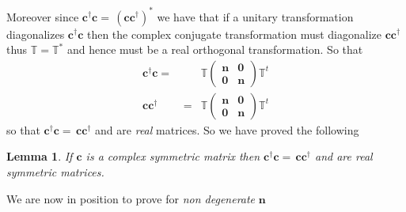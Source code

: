 \documentclass{article}
\newtheorem{lemma}[theorem]{Lemma}
\begin{document}
Moreover since $\mathbf{c}^{\dagger }\mathbf{c=\,}\left( \mathbf{cc}%
^{\dagger }\right) ^{\ast }$ we have that if a unitary transformation
diagonalizes $\mathbf{c}^{\dagger }\mathbf{c}$ then the complex conjugate
transformation must diagonalize $\mathbf{cc}^{\dagger }$ thus $\mathbb{T=T}%
^{\ast }$ and hence must be a real orthogonal transformation. So that 
\begin{eqnarray}
\mathbf{c}^{\dagger }\mathbf{c}\mathbf{=\,} &&\mathbb{T}\left( 
\begin{array}{cc}
\mathbf{n} & \mathbf{0} \\ 
\mathbf{0} & \mathbf{n}%
\end{array}%
\right) \mathbb{T}^{t} \\
\mathbf{cc}^{\dagger } &=&\mathbb{T}\left( 
\begin{array}{cc}
\mathbf{n} & \mathbf{0} \\ 
\mathbf{0} & \mathbf{n}%
\end{array}%
\right) \mathbb{T}^{t}
\end{eqnarray}%
so that $\mathbf{c}^{\dagger }\mathbf{c=\,cc}^{\dagger }$ and are \emph{real 
}matrices. So we have proved the following

\begin{lemma}
If $\mathbf{c}$ is a complex symmetric matrix then $\mathbf{c}^{\dagger }%
\mathbf{c=\,cc}^{\dagger }$ and are real symmetric matrices.
\end{lemma}

We are now in position to prove for \emph{non degenerate }$\mathbf{n}$
\end{document}

